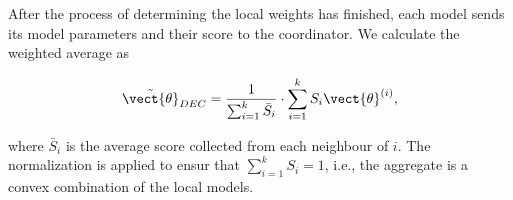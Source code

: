 After the process of determining the local weights has finished, each model sends its model parameters and their score to the coordinator. 
We calculate the weighted average as 

\begin{equation}
    \tilde{\vect{\theta}}_{DEC} = \frac{1}{\sum_{i=1}^k \bar{S}_i} \cdot \sum_{i=1}^k S_i \vect{\theta}^{(i)},
\end{equation}

where $\bar{S}_i$ is the average score collected from each neighbour of $i$. 
The normalization is applied to ensur that $\sum_{i=1}^k S_i = 1$, i.e., the aggregate is a convex combination of the local models.

